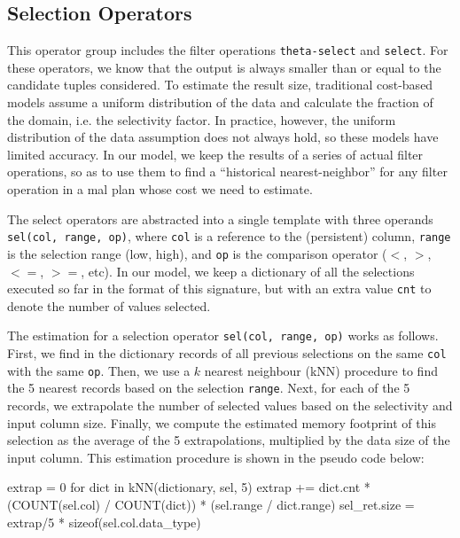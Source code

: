 \documentclass[conference]{IEEEtran}
\def\Skip{\par\medskip\nobreak\noindent}
\begin{document}

\subsection{Selection Operators}
This operator group includes the filter operations \texttt{\small theta-select} and \texttt{\small select}.
For these operators, we know that the output is always smaller than or equal to the candidate tuples considered.
To estimate the result size, traditional cost-based models assume a uniform distribution of the data and calculate the fraction of the domain, i.e. the selectivity factor.
In practice, however, the uniform distribution of the data assumption does not always hold, so these models have limited accuracy.
In our model, we keep the results of a series of actual filter operations, so as to use them to find a ``historical nearest-neighbor'' for any filter operation in a {\sc mal} plan whose cost we need to estimate.

The select operators are abstracted into a single template with three operands \texttt{\small sel(col, range, op)}, where \texttt{\small col} is a reference to the (persistent) column, \texttt{\small range} is the selection range (low, high), and \texttt{\small op} is the comparison operator ($<$, $>$, $<=$, $>=$, etc).
In our model, we keep a dictionary of all the selections executed so far in the format of this signature, but with an extra value \texttt{\small cnt} to denote the number of values selected.

The estimation for a selection operator \texttt{\small sel(col, range, op)} works as follows.
First, we find in the dictionary records of all previous selections on the same \texttt{\small col} with the same \texttt{\small op}.
Then, we use a $k$ nearest neighbour (kNN) procedure to find the 5 nearest records based on the selection \texttt{\small range}.
Next, for each of the 5 records, we extrapolate the number of selected values based on the selectivity and input column size. 
Finally, we compute the estimated memory footprint of this selection as the average of the 5 extrapolations, multiplied by the data size of the input column.
This estimation procedure is shown in the pseudo code below:
\begin{verb}
extrap = 0
for dict in kNN(dictionary, sel, 5)
  extrap += dict.cnt * (COUNT(sel.col) / COUNT(dict)) * 
            (sel.range / dict.range)
sel_ret.size = extrap/5 * sizeof(sel.col.data_type)
\end{verb}
\end{document}
